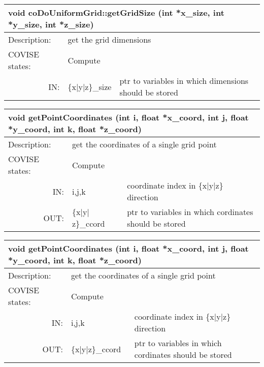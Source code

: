 \begin{htmlonly}
\begin{longtable}{|p{4cm}|p{2.5cm}|p{7cm}|}
\hline
\multicolumn{3}{|p{13.5cm}|}{\bf void coDoUniformGrid::getGridSize \newline
           (int *x\_size, int *y\_size, int *z\_size)}\\
\hline
{Description:}  
           & \multicolumn{2}{p{9.5cm}|}{get the grid dimensions} \\
\hline
{COVISE states:}  
           & \multicolumn{2}{p{9.5cm}|}{Compute} \\
\hline
\multicolumn{1}{|r|}{IN:} & \multicolumn{1}{p{3cm}|}{\{x|y|z\}\_size} 
                          & \multicolumn{1}{p{5cm}|}{ptr to variables in which 
			  dimensions should be stored}\endhead
\hline
\end{longtable}
\end{htmlonly}

\latexonly
\begin{longtable}{|p{4cm}|p{2.5cm}|p{7cm}|}
\hline
\multicolumn{3}{|p{13.5cm}|}{\bf void getPointCoordinates \newline
(int i, float *x\_coord, int j,  float *y\_coord,  int k, float *z\_coord)}\\
\hline
{Description:}  
           & \multicolumn{2}{p{9.5cm}|}{get the coordinates of a single grid point} \\
\hline
{COVISE states:}  
           & \multicolumn{2}{p{9.5cm}|}{Compute} \\
\hline
\multicolumn{1}{|r|}{IN:} & \multicolumn{1}{p{3cm}|}{i,j,k} 
                          & \multicolumn{1}{p{5cm}|}{coordinate index in 
			     \{x$\mid$y$\mid$z\} direction}\\
\hline
\multicolumn{1}{|r|}{OUT:} & \multicolumn{1}{p{3cm}|}{\{x$\mid$y$\mid$z\}\_ccord} 
                          & \multicolumn{1}{p{5cm}|}{ptr to variables in 
			  which cordinates should be stored}\endhead
\hline
\end{longtable}
\endlatexonly

\begin{htmlonly}
\begin{longtable}{|p{4cm}|p{2.5cm}|p{7cm}|}
\hline
\multicolumn{3}{|p{13.5cm}|}{\bf void getPointCoordinates \newline
(int i, float *x\_coord, int j,  float *y\_coord,  int k, float *z\_coord)}\\
\hline
{Description:}  
           & \multicolumn{2}{p{9.5cm}|}{get the coordinates of a single grid point} \\
\hline
{COVISE states:}  
           & \multicolumn{2}{p{9.5cm}|}{Compute} \\
\hline
\multicolumn{1}{|r|}{IN:} & \multicolumn{1}{p{3cm}|}{i,j,k} 
                          & \multicolumn{1}{p{5cm}|}{coordinate index in 
			     \{x|y|z\} direction}\\
\hline
\multicolumn{1}{|r|}{OUT:} & \multicolumn{1}{p{3cm}|}{\{x|y|z\}\_ccord} 
                          & \multicolumn{1}{p{5cm}|}{ptr to variables in 
			  which cordinates should be stored}\endhead
\hline
\end{longtable}
\end{htmlonly}

